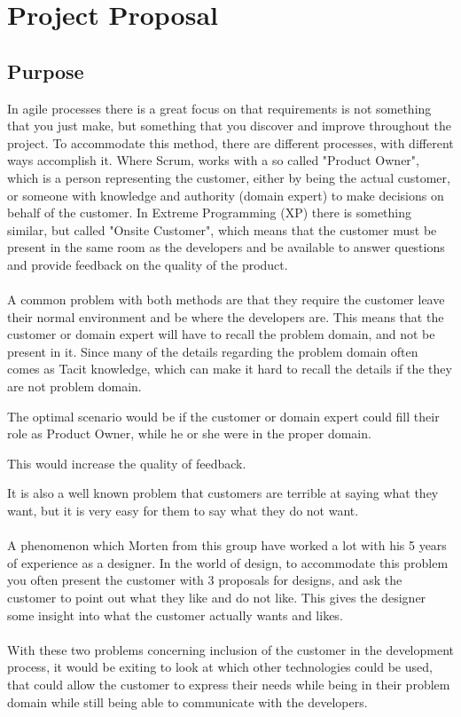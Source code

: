 \section{Project Proposal}
\subsection{Purpose}
In agile processes there is a great focus on that requirements is not something that you just make, but something that you discover and improve throughout the project.
To accommodate this method, there are different processes, with different ways accomplish it. 
Where Scrum, works with a so called "Product Owner", which is a person representing the customer, either by being the actual customer, or someone with knowledge and authority (domain expert) to make decisions on behalf of the customer. 
In Extreme Programming (XP) there is something similar, but called "Onsite Customer", which means that the customer must be present in the same room as the developers  and be available to answer questions and provide feedback on the quality of the product. 
\\\\
A common problem with both methods are that they require the customer leave their normal environment and be where the developers are. 
This means that the customer or domain expert will have to recall the problem domain, and not be present in it.
Since many of the details regarding the problem domain often comes as Tacit knowledge, which can make it hard to recall the details if the they are not problem domain. 

The optimal scenario would be if the customer or domain expert could fill their role as Product Owner, while he or she were in the proper domain. 

This would increase the quality of feedback.

It is also a well known problem that customers are terrible at saying what they want, but it is very easy for them to say what they do not want.
\\\\
A phenomenon which Morten from this group have worked a lot with his 5 years of experience as a designer.
In the world of design, to accommodate this problem you often present the customer with 3 proposals for designs, and ask the customer to point out what they like and do not like.
This gives the designer some insight into what the customer actually wants and likes. 
\\\\
With these two problems concerning inclusion of the customer in the development process, it would be exiting to look at which other technologies could be used, that could allow the customer to express their needs while being in their problem domain while still being able to communicate with the developers. 

